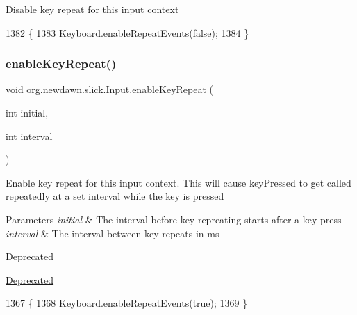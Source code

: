 Disable key repeat for this input context 
\begin{DoxyCode}
1382                                    \{
1383         Keyboard.enableRepeatEvents(\textcolor{keyword}{false});
1384     \}
\end{DoxyCode}
\mbox{\label{classorg_1_1newdawn_1_1slick_1_1_input_a949805ba38338134d88e0082d10a29ed}} 
\subsubsection{\texorpdfstring{enable\+Key\+Repeat()}{enableKeyRepeat()}\hspace{0.1cm}{\footnotesize\ttfamily [1/2]}}
{\footnotesize\ttfamily void org.\+newdawn.\+slick.\+Input.\+enable\+Key\+Repeat (\begin{DoxyParamCaption}\item[{int}]{initial,  }\item[{int}]{interval }\end{DoxyParamCaption})\hspace{0.3cm}{\ttfamily [inline]}}

Enable key repeat for this input context. This will cause key\+Pressed to get called repeatedly at a set interval while the key is pressed


\begin{DoxyParams}{Parameters}
{\em initial} & The interval before key repreating starts after a key press \\
\hline
{\em interval} & The interval between key repeats in ms \\
\hline
\end{DoxyParams}
\begin{DoxyRefDesc}{Deprecated}
\item[\mbox{\hyperlink{deprecated__deprecated000003}{Deprecated}}]\end{DoxyRefDesc}

\begin{DoxyCode}
1367                                                            \{
1368         Keyboard.enableRepeatEvents(\textcolor{keyword}{true});
1369     \}
\end{DoxyCode}
\mbox{\label{classorg_1_1newdawn_1_1slick_1_1_input_acadc9ec95201bfaf4787205c9033443e}} 
